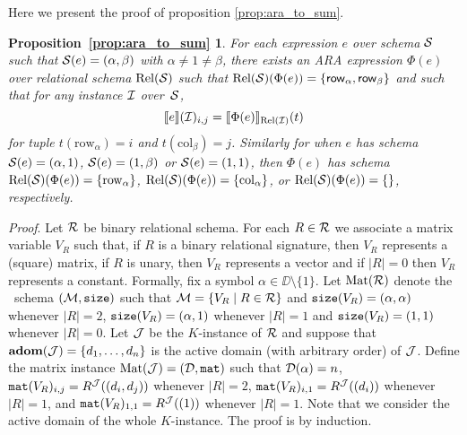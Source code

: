 \newtheorem*{ARATOSUM}{Proposition~\ref{prop:ara_to_sum}}

Here we present the proof of proposition \ref{prop:ara_to_sum}.

\begin{ARATOSUM}
  For each \langsum expression $e$ over schema $\mathcal{S}$ such that $\mathcal{S}(e)=(\alpha,\beta)$ with $\alpha\neq 1\neq\beta$, there exists an ARA expression $\Phi(e)$ over relational schema $\text{Rel}(\mathcal{S})$ such that $\text{Rel}(\mathcal{S})(\Phi(e))=\{\mathsf{row}_\alpha,\mathsf{row}_\beta\}$ and 
	such that for any instance $\mathcal{I}$ over~$\mathcal{S}$,
	$$
	\llbracket e \rrbracket(\mathcal{I})_{i,j}=\llbracket \Phi(e) \rrbracket_{\text{Rel}(\mathcal{I})}(t)
	$$
	for tuple $t(\mathrm{row}_\alpha)=i$ and $t(\mathrm{col}_\beta)=j$. Similarly for when $e$ has schema $\mathcal{S}(e)=(\alpha,1)$, $\mathcal{S}(e)=(1,\beta)$ or $\mathcal{S}(e)=(1,1)$, then $\Phi(e)$ has schema $\text{Rel}(\mathcal{S})(\Phi(e))=\{\mathrm{row}_\alpha\}$,
	$\text{Rel}(\mathcal{S})(\Phi(e))=\{\mathrm{col}_\alpha\}$, or
	$\text{Rel}(\mathcal{S})(\Phi(e))=\{\}$, respectively.
\end{ARATOSUM}

\textit{Proof}. Let $\mathcal{R}$ be binary relational schema. For each $R\in \mathcal{R}$ we associate a matrix variable 
$V_R$ such that, if $R$ is a binary relational signature, then $V_R$ represents a (square) matrix, 
if $R$ is unary, then $V_R$ represents a vector and if $|R|=0$ then $V_R$ represents a constant. Formally, 
fix a symbol $\alpha \in \DD \setminus \{1\}$. Let $\text{Mat}(\mathcal{R})$ denote the \lang \ schema
$(\mathcal{M},\texttt{size})$ such that $\mathcal{M} = \{ V_R \mid R \in \mathcal{R}\}$ and $\texttt{size}(V_R) = (\alpha, \alpha)$ 
whenever $|R| = 2$, $\texttt{size}(V_R) = (\alpha, 1)$ whenever $|R|=1$ and $\texttt{size}(V_R) = (1, 1)$ whenever $|R|=0$. 
Let $\mathcal{J}$ be the $K$-instance of $\mathcal{R}$ and suppose that $\mathbf{adom}(\mathcal{J}) = \{d_1, \ldots, d_n\}$ is 
the active domain (with arbitrary order) of $\mathcal{J}$. 
Define the matrix instance $\text{Mat}(\mathcal{J}) = (\mathcal{D},\texttt{mat})$ such 
that $\mathcal{D}(\alpha) = n$, $\texttt{mat}(V_R)_{i,j} = R^{\mathcal{J}}((d_i, d_j))$ whenever $|R|=2$, $\texttt{mat}(V_R)_{i,1} = R^{\mathcal{J}}((d_i))$ 
whenever $|R|=1$, and $\texttt{mat}(V_R)_{1,1} = R^{\mathcal{J}}((1))$ whenever $|R|=1$. 
Note that we consider the active domain of the whole $K$-instance.
The proof is by induction.


